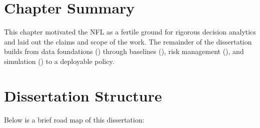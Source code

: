 \section{Chapter Summary}
This chapter motivated the NFL as a fertile ground for rigorous decision analytics and laid out the claims and scope of the work. The remainder of the dissertation builds from data foundations () through baselines (), risk management (), and simulation () to a deployable policy.

\section{Dissertation Structure}

Below is a brief road map of this dissertation:

